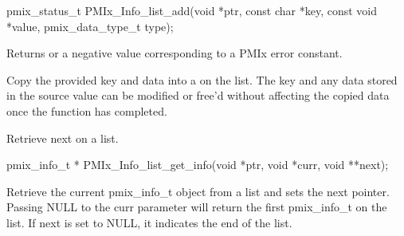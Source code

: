 \cspecificstart
\begin{codepar}
pmix_status_t
PMIx_Info_list_add(void *ptr,
                   const char *key,
                   const void *value,
                   pmix_data_type_t type);
\end{codepar}
\cspecificend

\begin{arglist}
\end{arglist}

Returns  or a negative value corresponding to a PMIx error constant.

\descr

Copy the provided key and data into a  on the list. The key and any data stored in the source value can be modified or free'd without affecting the copied data once the function has completed.


\summary

Retrieve next  on a list.

\format

\cspecificstart
\begin{codepar}
pmix_info_t *
PMIx_Info_list_get_info(void *ptr,
                        void *curr,
                        void **next);
\end{codepar}
\cspecificend

\begin{arglist}
\end{arglist}


\descr

Retrieve the current pmix_info_t object from a list and sets the next pointer. Passing NULL to the curr parameter will return the first pmix_info_t on the list. If next is set to NULL, it indicates the end of the list.


